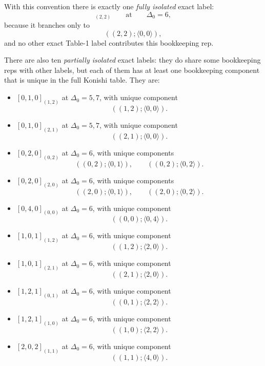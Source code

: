 \documentclass[12pt]{article}
\newcommand{\D}{\Delta}
\newcommand{\la}{\langle}
\newcommand{\ra}{\rangle}
\begin{document}
With this convention there is exactly one \emph{fully isolated} exact label:
\begin{equation}
[0,0,0]_{(2,2)}\qquad \text{at}\qquad \D_0=6,
\end{equation}
because it branches only to
\begin{equation}
((2,2);\la 0,0\ra),
\end{equation}
and no other exact Table-1 label contributes this bookkeeping rep.

There are also ten \emph{partially isolated} exact labels: they do share some bookkeeping reps
with other labels, but each of them has at least one bookkeeping component that is unique in the
full Konishi table. They are:
\begin{itemize}
\item $[0,1,0]_{(1,2)}$ at $\D_0=5,7$, with unique component
\begin{equation}
((1,2);\la 0,0\ra).
\end{equation}
\item $[0,1,0]_{(2,1)}$ at $\D_0=5,7$, with unique component
\begin{equation}
((2,1);\la 0,0\ra).
\end{equation}
\item $[0,2,0]_{(0,2)}$ at $\D_0=6$, with unique components
\begin{equation}
((0,2);\la 0,1\ra),\qquad ((0,2);\la 0,2\ra).
\end{equation}
\item $[0,2,0]_{(2,0)}$ at $\D_0=6$, with unique components
\begin{equation}
((2,0);\la 0,1\ra),\qquad ((2,0);\la 0,2\ra).
\end{equation}
\item $[0,4,0]_{(0,0)}$ at $\D_0=6$, with unique component
\begin{equation}
((0,0);\la 0,4\ra).
\end{equation}
\item $[1,0,1]_{(1,2)}$ at $\D_0=6$, with unique component
\begin{equation}
((1,2);\la 2,0\ra).
\end{equation}
\item $[1,0,1]_{(2,1)}$ at $\D_0=6$, with unique component
\begin{equation}
((2,1);\la 2,0\ra).
\end{equation}
\item $[1,2,1]_{(0,1)}$ at $\D_0=6$, with unique component
\begin{equation}
((0,1);\la 2,2\ra).
\end{equation}
\item $[1,2,1]_{(1,0)}$ at $\D_0=6$, with unique component
\begin{equation}
((1,0);\la 2,2\ra).
\end{equation}
\item $[2,0,2]_{(1,1)}$ at $\D_0=6$, with unique component
\begin{equation}
((1,1);\la 4,0\ra).
\end{equation}
\end{itemize}
\end{document}
